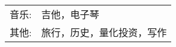 %
%



\begin{tabular}{rl}
    \textsc{音乐:} & 吉他，电子琴 \\
    \textsc{其他:} & 旅行，历史，量化投资，写作\\
\end{tabular}